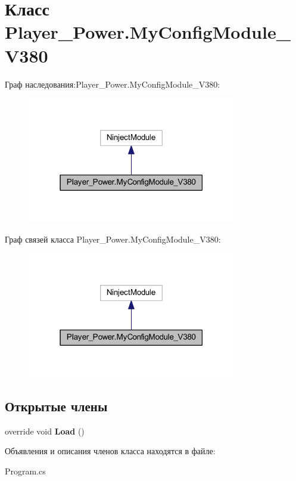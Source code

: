 \section{Класс Player\-\_\-\-Power.\-My\-Config\-Module\-\_\-\-V380}
\label{class_player___power_1_1_my_config_module___v380}


Граф наследования\-:Player\-\_\-\-Power.\-My\-Config\-Module\-\_\-\-V380\-:
\nopagebreak
\begin{figure}[H]
\begin{center}
\leavevmode
\includegraphics[width=259pt]{class_player___power_1_1_my_config_module___v380__inherit__graph}
\end{center}
\end{figure}


Граф связей класса Player\-\_\-\-Power.\-My\-Config\-Module\-\_\-\-V380\-:
\nopagebreak
\begin{figure}[H]
\begin{center}
\leavevmode
\includegraphics[width=259pt]{class_player___power_1_1_my_config_module___v380__coll__graph}
\end{center}
\end{figure}
\subsection*{Открытые члены}
\begin{DoxyCompactItemize}
\item 
override void {\bfseries Load} ()\label{class_player___power_1_1_my_config_module___v380_a09fe5e47f6d3b8cb32fa687e609296e6}

\end{DoxyCompactItemize}


Объявления и описания членов класса находятся в файле\-:\begin{DoxyCompactItemize}
\item 
Program.\-cs\end{DoxyCompactItemize}
